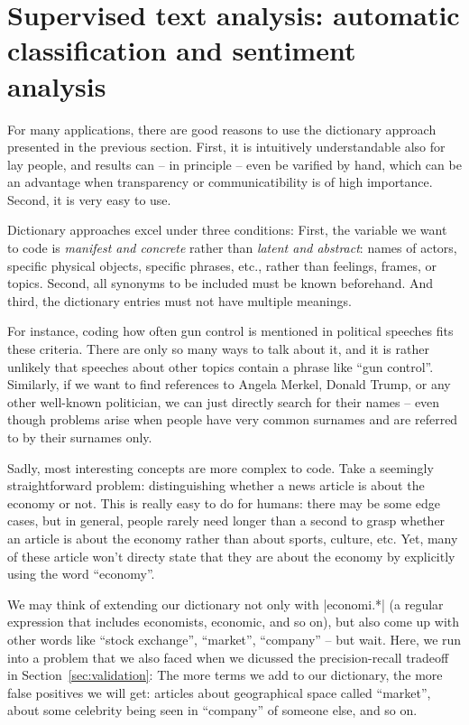\section{Supervised text analysis: automatic classification and sentiment analysis}
\label{sec:supervised}

For many applications, there are good reasons to use the dictionary
approach presented in the previous section. First, it is intuitively
understandable also for lay people, and results can -- in principle --
even be varified by hand, which can be an advantage when transparency
or communicatibility is of high importance. Second, it is very easy to
use.

Dictionary approaches excel under three conditions: First, the
variable we want to code is \emph{manifest and concrete} rather than
\emph{latent and abstract}: names of actors, specific physical
objects, specific phrases, etc., rather than feelings, frames, or
topics. Second, all synonyms to be included must be known
beforehand. And third, the dictionary entries must not have multiple
meanings.

For instance, coding how often gun control is mentioned in political
speeches fits these criteria. There are only so many ways to talk
about it, and it is rather unlikely that speeches about other topics
contain a phrase like ``gun control''. Similarly, if we want to find
references to Angela Merkel, Donald Trump, or any other well-known
politician, we can just directly search for their names -- even though
problems arise when people have very common surnames and are referred
to by their surnames only.

Sadly, most interesting concepts are more complex to code. Take a
seemingly straightforward problem: distinguishing whether a news
article is about the economy or not. This is really easy to do for
humans: there may be some edge cases, but in general, people rarely
need longer than a second to grasp whether an article is about the
economy rather than about sports, culture, etc. Yet, many of these
article won't directy state that they are about the economy by
explicitly using the word ``economy''.

We may think of extending our dictionary not only with |economi.*| (a
regular expression that includes economists, economic, and so on), but
also come up with other words like ``stock exchange'', ``market'',
``company'' -- but wait. Here, we run into a problem that we also
faced when we dicussed the precision-recall tradeoff in
Section~\ref{sec:validation}: The more terms we add to our
dictionary, the more false positives we will get: articles about
geographical space called ``market'', about some celebrity being seen
in ``company'' of someone else, and so on.

